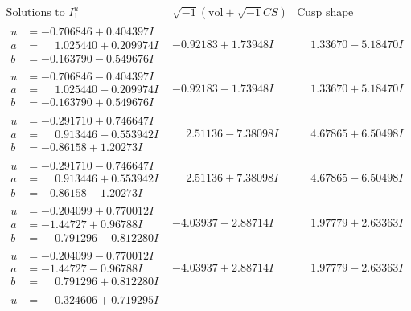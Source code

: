 \documentclass[1p]{elsarticle_modified}
\theoremstyle{definition}
\newcommand{\I}{\sqrt{-1}}
\begin{document}
$$\begin{array}{c|c|c}
\text{Solutions to }I^u_{1}& \I (\text{vol} + \sqrt{-1}CS) & \text{Cusp shape}\\
 \hline 
\begin{aligned}
u &= -0.706846 + 0.404397 I \\
a &= \phantom{-}1.025440 + 0.209974 I \\
b &= -0.163790 - 0.549676 I\end{aligned}
 & -0.92183 + 1.73948 I & \phantom{-}1.33670 - 5.18470 I \\ \hline\begin{aligned}
u &= -0.706846 - 0.404397 I \\
a &= \phantom{-}1.025440 - 0.209974 I \\
b &= -0.163790 + 0.549676 I\end{aligned}
 & -0.92183 - 1.73948 I & \phantom{-}1.33670 + 5.18470 I \\ \hline\begin{aligned}
u &= -0.291710 + 0.746647 I \\
a &= \phantom{-}0.913446 - 0.553942 I \\
b &= -0.86158 + 1.20273 I\end{aligned}
 & \phantom{-}2.51136 - 7.38098 I & \phantom{-}4.67865 + 6.50498 I \\ \hline\begin{aligned}
u &= -0.291710 - 0.746647 I \\
a &= \phantom{-}0.913446 + 0.553942 I \\
b &= -0.86158 - 1.20273 I\end{aligned}
 & \phantom{-}2.51136 + 7.38098 I & \phantom{-}4.67865 - 6.50498 I \\ \hline\begin{aligned}
u &= -0.204099 + 0.770012 I \\
a &= -1.44727 + 0.96788 I \\
b &= \phantom{-}0.791296 - 0.812280 I\end{aligned}
 & -4.03937 - 2.88714 I & \phantom{-}1.97779 + 2.63363 I \\ \hline\begin{aligned}
u &= -0.204099 - 0.770012 I \\
a &= -1.44727 - 0.96788 I \\
b &= \phantom{-}0.791296 + 0.812280 I\end{aligned}
 & -4.03937 + 2.88714 I & \phantom{-}1.97779 - 2.63363 I \\ \hline\begin{aligned}
u &= \phantom{-}0.324606 + 0.719295 I \\

\end{aligned}
\end{array}$$
\end{document}
